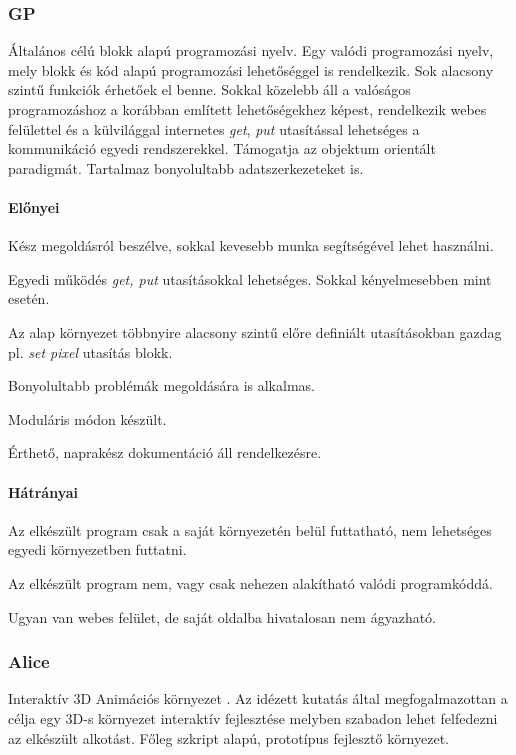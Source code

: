 \documentclass[12pt,a4paper,oneside]{report} %
\begin{document}
\subsubsection{GP} Általános célú blokk alapú \cite{ohshima2015module} \cite{monig2015blocks} programozási nyelv. Egy valódi programozási nyelv, mely blokk és kód alapú programozási lehetőséggel is rendelkezik.  Sok alacsony szintű funkciók érhetőek el benne. Sokkal közelebb áll a valóságos programozáshoz a korábban említett lehetőségekhez képest, rendelkezik webes felülettel és a külvilággal internetes \textit{get}, \textit{put} utasítással lehetséges a kommunikáció egyedi rendszerekkel. Támogatja az objektum orientált paradigmát. Tartalmaz bonyolultabb adatszerkezeteket is.
\paragraph{Előnyei} 
\begin{compactitem}
	\item Kész megoldásról beszélve, sokkal kevesebb munka segítségével lehet használni.
	\item Egyedi működés \textit{get, put} utasításokkal lehetséges. \newline Sokkal kényelmesebben mint  esetén.
	\item Az alap környezet többnyire alacsony szintű előre definiált utasításokban gazdag pl. \textit{set pixel} utasítás blokk.
	\item Bonyolultabb problémák megoldására is alkalmas.
	\item Moduláris módon készült.
	\item Érthető, naprakész dokumentáció áll rendelkezésre.
\end{compactitem}
\paragraph{Hátrányai} 
\begin{compactitem}
	\item Az elkészült program csak a saját környezetén belül futtatható, nem lehetséges egyedi környezetben futtatni.
	\item Az elkészült program nem, vagy csak nehezen alakítható valódi programkóddá.
	\item Ugyan van webes felület, de saját oldalba hivatalosan nem ágyazható.
\end{compactitem}

\subsubsection{Alice} Interaktív 3D Animációs környezet \cite{cooper2000alice}. Az idézett kutatás által megfogalmazottan a  célja egy 3D-s környezet interaktív fejlesztése melyben szabadon lehet felfedezni az elkészült alkotást. Főleg szkript alapú, prototípus fejlesztő környezet. 
\end{document}

